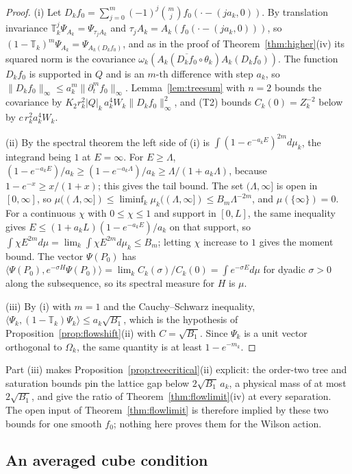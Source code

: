 \documentclass[aps,prd,twocolumn,superscriptaddress,nofootinbib,longbibliography,floatfix,amsmath,amssymb,10pt]{revtex4-2}
\theoremstyle{definition}
\theoremstyle{remark}
\newcommand{\ip}[2]{\langle #1,#2\rangle}
\begin{document}
\begin{proof}
(i) Let $D_kf_0=\sum_{j=0}^m(-1)^j\binom mjf_0(\cdot-(ja_k,0))$. By
translation invariance $\mathbb T_k^j\Psi_{A_k}=\Psi_{\tau_jA_k}$ and
$\tau_jA_k=A_k(f_0(\cdot-(ja_k,0)))$, so
$(1-\mathbb T_k)^m\Psi_{A_k}=\Psi_{A_k(D_kf_0)}$, and as in the proof of
Theorem~\ref{thm:higher}(iv) its squared norm is the covariance
$\omega_k(A_k(\overline{D_kf_0}\circ\theta_k)A_k(D_kf_0))$. The function
$D_kf_0$ is supported in $Q$ and is an $m$-th difference with step $a_k$, so
$\|D_kf_0\|_\infty\le a_k^m\|\partial_t^mf_0\|_\infty$. Lemma~\ref{lem:treesum}
with $n=2$ bounds the covariance by
$K_2r_k^2|Q|_k\,a_k^4W_k\|D_kf_0\|_\infty^2$, and (T2) bounds $C_k(0)=Z_k^{-2}$
below by $c\,r_k^2a_k^4W_k$.

(ii) By the spectral theorem the left side of (i) is
$\int(1-e^{-a_kE})^{2m}d\mu_k$, the integrand being $1$ at $E=\infty$. For
$E\ge\Lambda$, $(1-e^{-a_kE})/a_k\ge(1-e^{-a_k\Lambda})/a_k\ge
\Lambda/(1+a_k\Lambda)$, because $1-e^{-x}\ge x/(1+x)$; this gives the tail
bound. The set $(\Lambda,\infty]$ is open in $[0,\infty]$, so
$\mu((\Lambda,\infty])\le\liminf_k\mu_k((\Lambda,\infty])\le B_m\Lambda^{-2m}$,
and $\mu(\{\infty\})=0$. For a continuous $\chi$ with $0\le\chi\le1$ and support
in $[0,L]$, the same inequality gives $E\le(1+a_kL)(1-e^{-a_kE})/a_k$ on that
support, so $\int\chi E^{2m}d\mu=\lim_k\int\chi E^{2m}d\mu_k\le B_m$; letting
$\chi$ increase to $1$ gives the moment bound. The vector $\Psi(P_0)$ has
$\ip{\Psi(P_0)}{e^{-\sigma H}\Psi(P_0)}=\lim_kC_k(\sigma)/C_k(0)=\int
e^{-\sigma E}d\mu$ for dyadic $\sigma>0$ along the subsequence, so its spectral
measure for $H$ is $\mu$.

(iii) By (i) with $m=1$ and the Cauchy--Schwarz inequality,
$\ip{\Psi_k}{(1-\mathbb T_k)\Psi_k}\le a_k\sqrt{B_1}$, which is the hypothesis
of Proposition~\ref{prop:flowshift}(ii) with $C=\sqrt{B_1}$. Since $\Psi_k$ is
a unit vector orthogonal to $\Omega_k$, the same quantity is at least
$1-e^{-m_k}$.
\end{proof}

Part (iii) makes Proposition~\ref{prop:treecritical}(ii) explicit: the order-two
tree and saturation bounds pin the lattice gap below $2\sqrt{B_1}\,a_k$, a
physical mass of at most $2\sqrt{B_1}$, and give the ratio of
Theorem~\ref{thm:flowlimit}(iv) at every separation. The open input of
Theorem~\ref{thm:flowlimit} is therefore implied by these two bounds for one
smooth $f_0$; nothing here proves them for the Wilson action.

\subsection{An averaged cube condition}\label{ssec:averaged}
\end{document}
